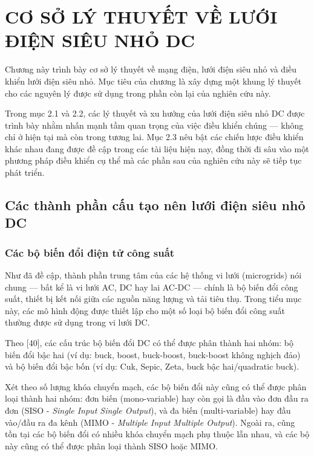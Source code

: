 \clearpage
\section{CƠ SỞ LÝ THUYẾT VỀ LƯỚI ĐIỆN SIÊU NHỎ DC}
Chương này trình bày cơ sở lý thuyết về mạng điện, lưới điện siêu nhỏ và điều khiển lưới điện siêu nhỏ. Mục tiêu của chương là xây dựng một khung lý thuyết cho các nguyên lý được sử dụng trong phần còn lại của nghiên cứu này. \par
Trong mục 2.1 và 2.2, các lý thuyết và xu hướng của lưới điện siêu nhỏ DC được trình bày nhằm nhấn mạnh tầm quan trọng của việc điều khiển chúng — không chỉ ở hiện tại mà còn trong tương lai. Mục 2.3 nêu bật các chiến lược điều khiển khác nhau đang được đề cập trong các tài liệu hiện nay, đồng thời đi sâu vào một phương pháp điều khiển cụ thể mà các phần sau của nghiên cứu này sẽ tiếp tục phát triển. \par

\subsection{Các thành phần cấu tạo nên lưới điện siêu nhỏ DC}
\subsubsection{Các bộ biến đổi điện tử công suất}
Như đã đề cập, thành phần trung tâm của các hệ thống vi lưới (microgrids) nói chung — bất kể là vi lưới AC, DC hay lai AC-DC — chính là bộ biến đổi công suất, thiết bị kết nối giữa các nguồn năng lượng và tải tiêu thụ. Trong tiểu mục này, các mô hình động được thiết lập cho một số loại bộ biến đổi công suất thường được sử dụng trong vi lưới DC. \par
Theo [40], các cấu trúc bộ biến đổi DC có thể được phân thành hai nhóm: bộ biến đổi bậc hai (ví dụ: buck, boost, buck-boost, buck-boost không nghịch đảo) và bộ biến đổi bậc bốn (ví dụ: Cuk, Sepic, Zeta, buck bậc hai/quadratic buck). \par
Xét theo số lượng khóa chuyển mạch, các bộ biến đổi này cũng có thể được phân loại thành hai nhóm: đơn biến (mono-variable) hay còn gọi là đầu vào đơn đầu ra đơn (SISO - \textit{Single Input Single Output}), và đa biến (multi-variable) hay đầu vào/đầu ra đa kênh (MIMO - \textit{Multiple Input Multiple Output}). Ngoài ra, cũng tồn tại các bộ biến đổi có nhiều khóa chuyển mạch phụ thuộc lẫn nhau, và các bộ này cũng có thể được phân loại thành SISO hoặc MIMO. \par
